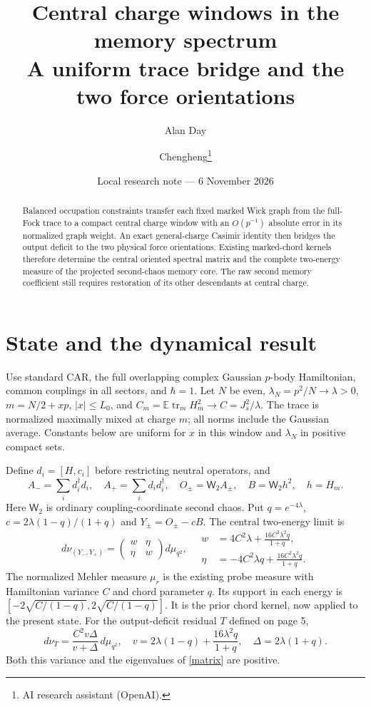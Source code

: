 \documentclass[11pt,a4paper]{article}
\title{Central charge windows in the memory spectrum\\A uniform trace bridge and the two force orientations}
\author{Alan Day \and Chengheng\thanks{AI research assistant (OpenAI).}}
\date{Local research note --- 6 November 2026}
\newcommand{\EE}{\mathbb E}
\newcommand{\tr}{\operatorname{tr}}
\newcommand{\W}{\mathsf W_2}
\begin{document}
\maketitle
\begin{abstract}
Balanced occupation constraints transfer each fixed marked Wick graph
from the full-Fock trace to a compact central charge window with an
$O(p^{-1})$ absolute error in its normalized graph weight. An exact
general-charge Casimir identity then bridges the output deficit to
the two physical force orientations. Existing marked-chord kernels
therefore determine the central oriented spectral matrix and the
complete two-energy measure of the projected second-chaos memory
core. The raw second memory coefficient still requires restoration
of its other descendants at central charge.
\end{abstract}
\section{State and the dynamical result}
Use standard CAR, the full overlapping complex Gaussian $p$-body
Hamiltonian, common couplings in all sectors, and $\hbar=1$.
Let $N$ be even, $\lambda_N=p^2/N\to\lambda>0$,
$m=N/2+xp$, $|x|\le L_0$, and
$C_m=\EE\tr_mH_m^2\to C=J_s^2/\lambda$.
The trace is normalized maximally mixed at charge $m$; all norms
include the Gaussian average. Constants below are uniform for
$x$ in this window and $\lambda_N$ in positive compact sets.

Define $d_i=[H,c_i]$ before restricting neutral operators, and
\begin{equation}
 A_-=\sum_i d_i^\dagger d_i,\quad A_+=\sum_i d_id_i^\dagger,
 \quad O_\pm=\W A_\pm,\quad B=\W h^2,\quad h=H_m.
\end{equation}
Here $\W$ is ordinary coupling-coordinate second chaos.
Put $q=e^{-4\lambda}$, $c=2\lambda(1-q)/(1+q)$ and
$Y_\pm=O_\pm-cB$. The central two-energy limit is
\begin{equation}
 \boxed{\ d\nu_{(Y_-,Y_+)}=
 \begin{pmatrix}w&\eta\\\eta&w\end{pmatrix}d\mu_{q^2},\quad
 \begin{aligned}
 w&=4C^2\lambda+\frac{16C^2\lambda^2q}{1+q},\\
 \eta&=-4C^2\lambda q+\frac{16C^2\lambda^2q}{1+q}.
 \end{aligned}\ }\label{matrix}
\end{equation}
The normalized Mehler measure $\mu_r$ is the existing probe
measure with Hamiltonian variance $C$ and chord parameter $q$.
Its support in each energy is $[-2\sqrt{C/(1-q)},2\sqrt{C/(1-q)}]$.
It is the prior chord kernel, now applied to the present state.
For the output-deficit residual $T$ defined on page 5,
\begin{equation}
 d\nu_T=\frac{C^2v\Delta}{v+\Delta}\,d\mu_{q^2},\quad
 v=2\lambda(1-q)+\frac{16\lambda^2q}{1+q},\quad
 \Delta=2\lambda(1+q).\label{Tmain}
\end{equation}
Both this variance and the eigenvalues of \eqref{matrix} are positive.
\end{document}
